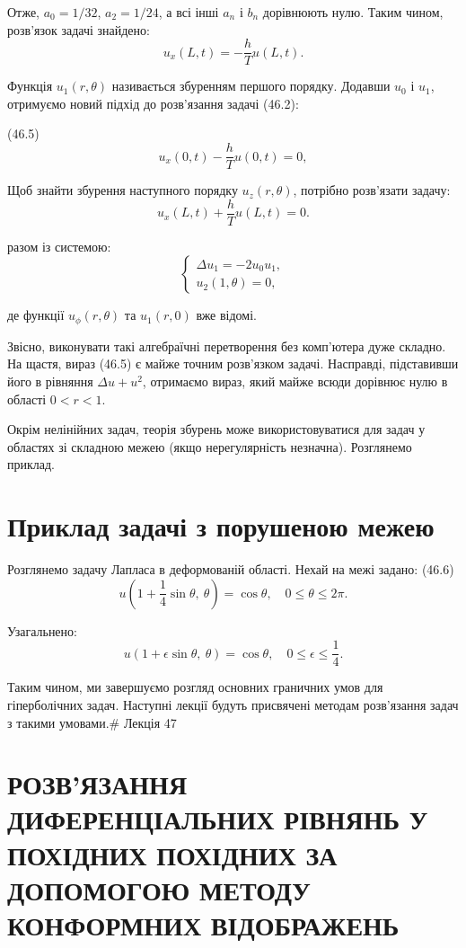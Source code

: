 \documentclass[
  ukrainian,
]{article}
\begin{document}
Отже, \(a_0=1/32\), \(a_2=1/24\), а всі інші \(a_n\) і \(b_n\)
дорівнюють нулю. Таким чином, розв'язок задачі знайдено: \[
u_x(L,t) = -\frac{h}{T} u(L,t).
\]

Функція \(u_1(r,\theta)\) називається збуренням першого порядку. Додавши
\(u_0\) і \(u_1\), отримуємо новий підхід до розв'язання задачі (46.2):

(46.5) \[
u_x(0,t) - \frac{h}{T}u(0,t) = 0,
\]

Щоб знайти збурення наступного порядку \(u_z(r,\theta)\), потрібно
розв'язати задачу: \[
u_x(L,t) + \frac{h}{T}u(L,t) = 0.
\]

разом із системою: \[
\begin{cases}
\Delta u_{1} = -2u_{0}u_{1}, \\
u_{2}(1,\theta) = 0,
\end{cases}
\]

де функції \(u_{\phi}(r,\theta)\) та \(u_{1}(r,0)\) вже відомі.

Звісно, виконувати такі алгебраїчні перетворення без комп'ютера дуже
складно. На щастя, вираз (46.5) є майже точним розв'язком задачі.
Насправді, підставивши його в рівняння \(\Delta u + u^{2}\), отримаємо
вираз, який майже всюди дорівнює нулю в області \(0 < r < 1\).

Окрім нелінійних задач, теорія збурень може використовуватися для задач
у областях зі складною межею (якщо нерегулярність незначна). Розглянемо
приклад.

\section{Приклад задачі з порушеною
межею}\label{ux43fux440ux438ux43aux43bux430ux434-ux437ux430ux434ux430ux447ux456-ux437-ux43fux43eux440ux443ux448ux435ux43dux43eux44e-ux43cux435ux436ux435ux44e}

Розглянемо задачу Лапласа в деформованій області. Нехай на межі задано:
(46.6) \[
u\left(1 + \frac{1}{4} \sin \theta,\ \theta\right) = \cos \theta,\quad 0 \le \theta \le 2\pi.
\]

Узагальнено: \[
u(1+\epsilon\sin\theta,\ \theta) = \cos\theta,\quad 0 \le \epsilon \le \frac{1}{4}.
\]

Таким чином, ми завершуємо розгляд основних граничних умов для
гіперболічних задач. Наступні лекції будуть присвячені методам
розв'язання задач з такими умовами.\# Лекція 47

\section{РОЗВ'ЯЗАННЯ ДИФЕРЕНЦІАЛЬНИХ РІВНЯНЬ У ПОХІДНИХ ПОХІДНИХ ЗА
ДОПОМОГОЮ МЕТОДУ КОНФОРМНИХ
ВІДОБРАЖЕНЬ}\label{ux440ux43eux437ux432ux44fux437ux430ux43dux43dux44f-ux434ux438ux444ux435ux440ux435ux43dux446ux456ux430ux43bux44cux43dux438ux445-ux440ux456ux432ux43dux44fux43dux44c-ux443-ux43fux43eux445ux456ux434ux43dux438ux445-ux43fux43eux445ux456ux434ux43dux438ux445-ux437ux430-ux434ux43eux43fux43eux43cux43eux433ux43eux44e-ux43cux435ux442ux43eux434ux443-ux43aux43eux43dux444ux43eux440ux43cux43dux438ux445-ux432ux456ux434ux43eux431ux440ux430ux436ux435ux43dux44c}
\end{document}
